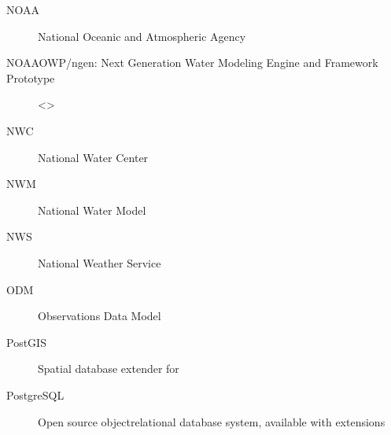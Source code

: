 \documentclass[letterpaper,12pt,english]{book}
\begin{document}
\begin{description}
\item[{NOAA\label{\detokenize{glossary:term-NOAA}}}] \leavevmode
\sphinxAtStartPar
National Oceanic and Atmospheric Agency

\item[{NOAA\sphinxhyphen{}OWP/ngen: Next Generation Water Modeling Engine and Framework Prototype\label{\detokenize{glossary:term-NOAA-OWP-ngen-Next-Generation-Water-Modeling-Engine-and-Framework-Prototype}}}] \leavevmode
\sphinxAtStartPar
\textless{}\textgreater{}

\item[{NWC\label{\detokenize{glossary:term-NWC}}}] \leavevmode
\sphinxAtStartPar
National Water Center

\item[{NWM\label{\detokenize{glossary:term-NWM}}}] \leavevmode
\sphinxAtStartPar
National Water Model

\item[{NWS\label{\detokenize{glossary:term-NWS}}}] \leavevmode
\sphinxAtStartPar
National Weather Service

\item[{ODM\label{\detokenize{glossary:term-ODM}}}] \leavevmode
\sphinxAtStartPar
Observations Data Model

\item[{PostGIS\label{\detokenize{glossary:term-PostGIS}}}] \leavevmode
\sphinxAtStartPar
Spatial database extender for {\hyperref[\detokenize{glossary:term-PostgreSQL}]{}}

\item[{PostgreSQL\label{\detokenize{glossary:term-PostgreSQL}}}] \leavevmode
\sphinxAtStartPar
Open source object\sphinxhyphen{}relational database system, available with {\hyperref[\detokenize{glossary:term-PostGIS}]{}} extensions


\end{description}
\end{document}
